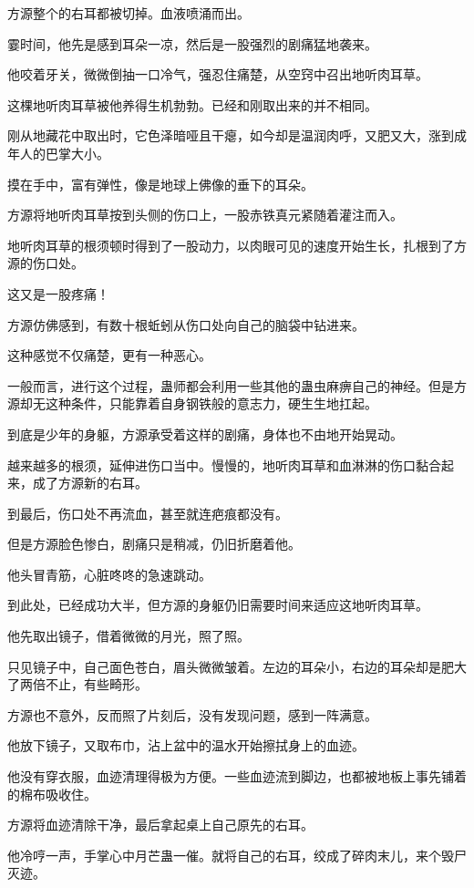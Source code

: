\begin{this_body}
方源整个的右耳都被切掉。血液喷涌而出。

霎时间，他先是感到耳朵一凉，然后是一股强烈的剧痛猛地袭来。

他咬着牙关，微微倒抽一口冷气，强忍住痛楚，从空窍中召出地听肉耳草。

这棵地听肉耳草被他养得生机勃勃。已经和刚取出来的并不相同。

刚从地藏花中取出时，它色泽暗哑且干瘪，如今却是温润肉呼，又肥又大，涨到成年人的巴掌大小。

摸在手中，富有弹性，像是地球上佛像的垂下的耳朵。

方源将地听肉耳草按到头侧的伤口上，一股赤铁真元紧随着灌注而入。

地听肉耳草的根须顿时得到了一股动力，以肉眼可见的速度开始生长，扎根到了方源的伤口处。

这又是一股疼痛！

方源仿佛感到，有数十根蚯蚓从伤口处向自己的脑袋中钻进来。

这种感觉不仅痛楚，更有一种恶心。

一般而言，进行这个过程，蛊师都会利用一些其他的蛊虫麻痹自己的神经。但是方源却无这种条件，只能靠着自身钢铁般的意志力，硬生生地扛起。

到底是少年的身躯，方源承受着这样的剧痛，身体也不由地开始晃动。

越来越多的根须，延伸进伤口当中。慢慢的，地听肉耳草和血淋淋的伤口黏合起来，成了方源新的右耳。

到最后，伤口处不再流血，甚至就连疤痕都没有。

但是方源脸色惨白，剧痛只是稍减，仍旧折磨着他。

他头冒青筋，心脏咚咚的急速跳动。

到此处，已经成功大半，但方源的身躯仍旧需要时间来适应这地听肉耳草。

他先取出镜子，借着微微的月光，照了照。

只见镜子中，自己面色苍白，眉头微微皱着。左边的耳朵小，右边的耳朵却是肥大了两倍不止，有些畸形。

方源也不意外，反而照了片刻后，没有发现问题，感到一阵满意。

他放下镜子，又取布巾，沾上盆中的温水开始擦拭身上的血迹。

他没有穿衣服，血迹清理得极为方便。一些血迹流到脚边，也都被地板上事先铺着的棉布吸收住。

方源将血迹清除干净，最后拿起桌上自己原先的右耳。

他冷哼一声，手掌心中月芒蛊一催。就将自己的右耳，绞成了碎肉末儿，来个毁尸灭迹。


\end{this_body}
